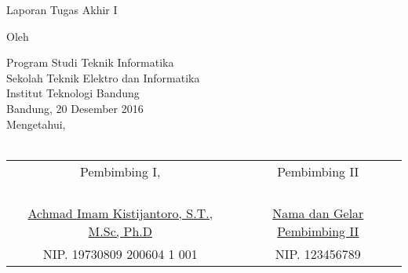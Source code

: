 \clearpage
\pagestyle{empty}

\begin{center}
\smallskip

    \Large \bfseries \MakeUppercase{\thetitle}
    \vfill

    \Large Laporan Tugas Akhir I
    \vfill

    \large Oleh

    \Large \theauthor

    \large Program Studi Teknik Informatika \\
    Sekolah Teknik Elektro dan Informatika \\
    Institut Teknologi Bandung \\

    \vfill
    \normalsize \normalfont
    Bandung, 20 Desember 2016 \\
    Mengetahui, \\~\\

    \setlength{\tabcolsep}{12pt}
    \begin{tabular}{c@{\hskip 0.5in}c}
        Pembimbing I, & Pembimbing II \\
        & \\
        & \\
        & \\
        & \\
        \underline{Achmad Imam Kistijantoro, S.T., M.Sc, Ph.D} & \underline{Nama dan Gelar Pembimbing II} \\
        NIP. 19730809 200604 1 001 & NIP. 123456789 \\
    \end{tabular}

\end{center}
\clearpage
